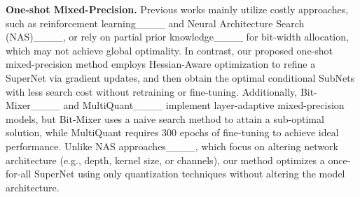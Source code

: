 {\bf One-shot Mixed-Precision.} 
Previous works mainly utilize costly approaches, such as reinforcement learning____ and Neural Architecture Search (NAS)____, or rely on partial prior knowledge____ for bit-width allocation, which may not achieve global optimality. In contrast, our proposed one-shot mixed-precision method employs Hessian-Aware optimization to refine a SuperNet via gradient updates, and then obtain the optimal conditional SubNets with less search cost without retraining or fine-tuning. Additionally, Bit-Mixer____ and MultiQuant____ implement layer-adaptive mixed-precision models, but Bit-Mixer uses a naive search method to attain a sub-optimal solution, while MultiQuant requires 300 epochs of fine-tuning to achieve ideal performance. Unlike NAS approaches____, which focus on altering network architecture (e.g., depth, kernel size, or channels), our method optimizes a once-for-all SuperNet using only quantization techniques without altering the model architecture.
